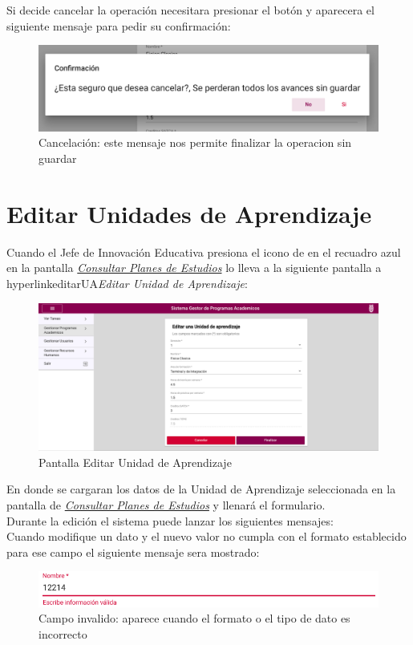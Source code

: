 Si decide cancelar la operación necesitara presionar el botón  y aparecera el siguiente mensaje para pedir su confirmación:\\
\begin{figure}[!hbtp]
    \centering
    \hypertarget{cancelarR}{\includegraphics[width=0.7\linewidth]{images/GUA/cancelar}}
    \caption{Cancelación: este mensaje nos permite finalizar la operacion sin guardar}
    \label{cancelarR}
\end{figure}
\newpage
\section{Editar Unidades de Aprendizaje}
Cuando el Jefe de Innovación Educativa presiona el icono de \BtnLapiz en el recuadro azul en la pantalla \hyperlink{consultarUA}{\textit{Consultar Planes de Estudios}} lo lleva a la siguiente pantalla a hyperlink{editarUA}{\textit{Editar Unidad de Aprendizaje}}:\\
\begin{figure}[!hbtp]
    \centering
    \hypertarget{editarUA}{\includegraphics[width=0.7\linewidth]{images/GUA/editarUA}}
    \caption{Pantalla Editar Unidad de Aprendizaje}
    \label{editarUA}
\end{figure}
En donde se cargaran los datos de la Unidad de Aprendizaje seleccionada en la pantalla de \hyperlink{consultarUA}{\textit{Consultar Planes de Estudios}}  y llenará el formulario.\\
Durante la edición el sistema puede lanzar los siguientes mensajes:\\
Cuando modifique un dato y el nuevo valor no cumpla con el formato establecido para ese campo el siguiente mensaje sera mostrado:\\
\begin{figure}[!hbtp]
    \centering
    \hypertarget{invalidoE}{\includegraphics[width=0.7\linewidth]{images/GUA/invalido}}
    \caption{Campo invalido: aparece cuando el formato o el tipo de dato es incorrecto}
    \label{invalidoE}
\end{figure}
